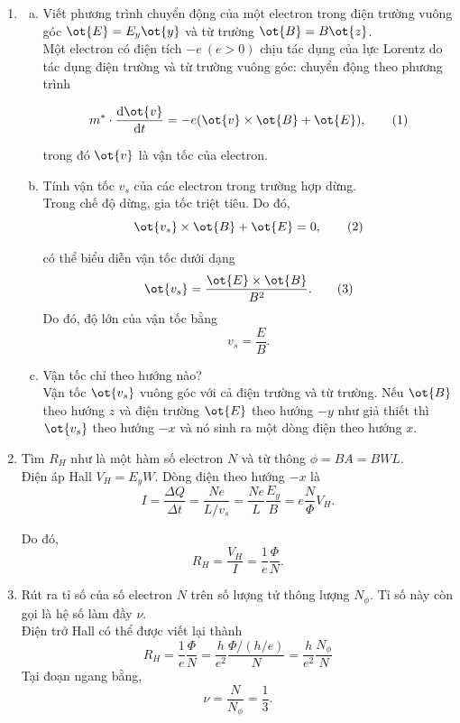 \begin{loigiai}
\begin{enumerate}[1)]
    \item 
\begin{enumerate}[a)]
    \item Viết phương trình chuyển động của một electron trong điện trường vuông góc $\ot{E}=E_{y}\ot{y}$ và từ trường $\ot{B}=B\ot{z}$.\\
    Một electron có điện tích $-e~(e>0)$ chịu tác dụng của lực Lorentz do tác dụng điện trường và từ trường vuông góc: chuyển động theo phương trình
    
    \[m^{\ast}\cdot\dfrac{\mathrm{d}\ot{v}}{\mathrm{d}t}=-e(\ot{v}\times\ot{B}+\ot{E}), \tag{1} \label{apho15sa.1}\]
    
    trong đó $\ot{v}$ là vận tốc của electron.
    \item Tính vận tốc $v_{s}$ của các electron trong trường hợp dừng.\\
    Trong chế độ dừng, gia tốc triệt tiêu. Do đó, 
    \[\ot{v_{s}}\times\ot{B}+\ot{E}=0, \tag{2} \label{apho15sa.2}\]

    có thể biểu diễn vận tốc dưới dạng
    \[\ot{v_{s}}=\dfrac{\ot{E}\times\ot{B}}{B^2}. \tag{3} \label{apho15sa.3}\]
    Do đó, độ lớn của vận tốc bằng
    \[v_{s}=\dfrac{E}{B}. \tag{4} \label{apho15sa.4}\]
    \item Vận tốc chỉ theo hướng nào?\\
    Vận tốc $\ot{v_{s}}$ vuông góc với cả điện trường và từ trường. Nếu $\ot{B}$ theo hướng $z$ và điện trường $\ot{E}$ theo hướng $-y$ như giả thiết thì $\ot{v_{s}}$ theo hướng $-x$ và nó sinh ra một dòng điện theo hướng $x$. 
\end{enumerate}
    \item Tìm $R_{H}$ như là một hàm số electron $N$ và từ thông $\phi=BA=BWL$.\\
    Điện áp Hall $V_{H}=E_{y}W$. Dòng điện theo hướng $-x$ là
    \[I=\dfrac{\Delta Q}{\Delta t}=\dfrac{Ne}{L/v_{s}}=\dfrac{Ne}{L}\dfrac{E_{y}}{B}=e\dfrac{N}{\Phi}V_{H}. \tag{5} \label{apho15sa.5}\]
    
    Do đó,
    \[R_{H}=\dfrac{V_{H}}{I}=\dfrac{1}{e}\dfrac{\Phi}{N}. \tag{6} \label{apho15sa.6}\]
    
    \item Rút ra tỉ số của số electron $N$ trên số lượng tử thông lượng $N_{\phi}$. Tỉ số này còn gọi là hệ số làm đầy $\nu$.\\
    Điện trở Hall có thể được viết lại thành
    \[R_{H}=\dfrac{1}{e}\dfrac{\Phi}{N}=\dfrac{h}{e^2}\dfrac{\Phi/(h/e)}{N}=\dfrac{h}{e^2}\dfrac{N_{\phi}}{N} \tag{7} \label{apho15sa.7}\]
    Tại đoạn ngang bằng,
    \[\nu =\dfrac{N}{N_{\phi}}=\dfrac{1}{3}. \tag{8} \label{apho15sa.8}\]
\end{enumerate}
\end{loigiai}



